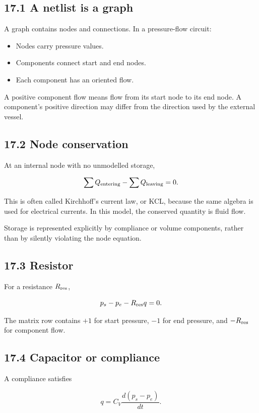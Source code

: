 \documentclass[11pt,a4paper]{article}
\begin{document}
\subsection{17.1 A netlist is a graph}
A graph contains nodes and connections. In a pressure-flow circuit:


\begin{itemize}
\item Nodes carry pressure values.


\item Components connect start and end nodes.


\item Each component has an oriented flow.


\end{itemize}
A positive component flow means flow from its start node to its end node. A component's positive direction may differ from the direction used by the external vessel.

\subsection{17.2 Node conservation}
At an internal node with no unmodelled storage,


\begingroup\small
\[
\sum Q_{\rm entering}-\sum Q_{\rm leaving}=0.
\]
\endgroup


This is often called Kirchhoff's current law, or KCL, because the same algebra is used for electrical currents. In this model, the conserved quantity is fluid flow.

Storage is represented explicitly by compliance or volume components, rather than by silently violating the node equation.

\subsection{17.3 Resistor}
For a resistance \(R_{\rm res}\),


\begingroup\small
\[
p_s-p_e-R_{\rm res}q=0.
\]
\endgroup


The matrix row contains \(+1\) for start pressure, \(-1\) for end pressure, and \(-R_{\rm res}\) for component flow.

\subsection{17.4 Capacitor or compliance}
A compliance satisfies


\begingroup\small
\[
q=C_V\frac{d(p_s-p_e)}{dt}.
\]
\endgroup
\end{document}
